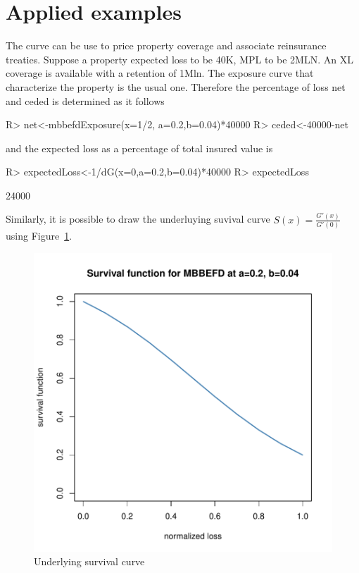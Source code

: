 \documentclass[nojss]{jss}
\begin{document}
\section{Applied examples}\label{sec:examples}
The curve can be use to price property coverage and associate reinsurance treaties. Suppose a property expected loss to be 40K, MPL to be 2MLN. An XL coverage is available with a retention of 1Mln. The exposure curve that characterize the property is the usual one. Therefore the percentage of loss net and ceded is determined as it follows

\begin{Schunk}
\begin{Sinput}
R> net<-mbbefdExposure(x=1/2, a=0.2,b=0.04)*40000
R> ceded<-40000-net
\end{Sinput}
\end{Schunk}

and the expected loss as a percentage of total insured value is

\begin{Schunk}
\begin{Sinput}
R> expectedLoss<-1/dG(x=0,a=0.2,b=0.04)*40000
R> expectedLoss
\end{Sinput}
\begin{Soutput}
[1] 24000
\end{Soutput}
\end{Schunk}


Similarly, it is possible to draw the underluying suvival curve $S\left( x \right) = \frac{{G'\left( x \right)}}{{G'\left( 0 \right)}}$ using  Figure~\ref{fig:survival}.

\begin{figure}
\begin{center}
\includegraphics{mbbefd-survivalPlot}
\caption{Underlying survival curve}
\label{fig:survival}
\end{center}
\end{figure}
\end{document}
